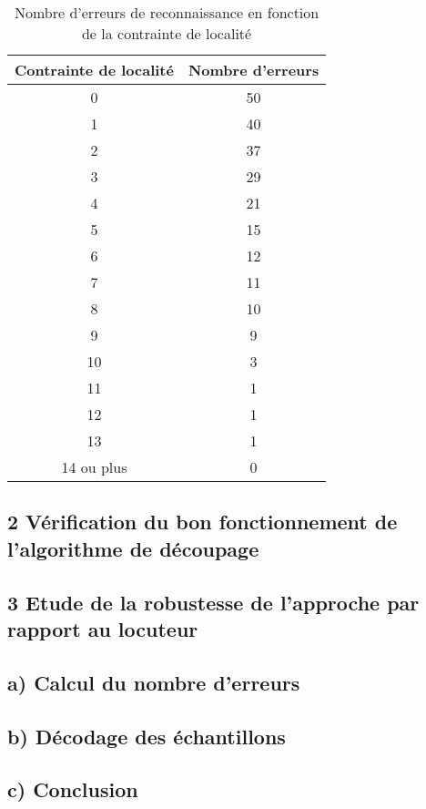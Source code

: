 \documentclass[a4paper,11pt]{article}
\begin{document}
\begin{center}


\begin{table}[H]

\begin{tabular}{|c|c|}

\hline
Contrainte de localité & Nombre d'erreurs \\
\hline
0 & 50 \\
\hline
1 & 40 \\
\hline
2 & 37 \\
\hline
3 & 29 \\
\hline
4 & 21 \\
\hline
5 & 15 \\
\hline
6 & 12 \\
\hline
7 & 11 \\
\hline
8 & 10 \\
\hline
9 & 9 \\
\hline
10 & 3 \\
\hline
11 & 1 \\
\hline
12 & 1 \\
\hline
13 & 1 \\
\hline
14 ou plus & 0 \\
\hline



\end{tabular}
\caption{Nombre d'erreurs de reconnaissance en fonction de la contrainte de localité\protect\footnotemark}
 
\end{table}
\end{center}

\subsection*{2  Vérification du bon fonctionnement de l'algorithme de découpage}

\subsection*{3  Etude de la robustesse de l'approche par rapport au locuteur}

\subsection*{a) Calcul du nombre d'erreurs}

\subsection*{b) Décodage des échantillons}

\subsection*{c) Conclusion}
\end{document}
